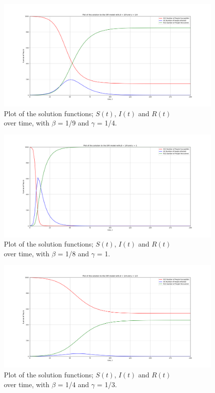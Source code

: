 \documentclass{article}
\begin{document}
\begin{figure}[!hp]
  \centering
  \includegraphics[width=1\linewidth]{Q2_plot2.png}
  \caption{Plot of the solution functions; $S(t)$, $I(t)$ and $R(t)$ \\ over time, with $\beta$ = 1/9 and $\gamma$ = 1/4.}
  \label{fig:Q2_plot2.png}
\end{figure}

\begin{figure}[!hp]
  \centering
  \includegraphics[width=1\linewidth]{Q2_plot3.png}
  \caption{Plot of the solution functions; $S(t)$, $I(t)$ and $R(t)$ \\ over time, with $\beta$ = 1/8 and $\gamma$ = 1.}
  \label{fig:Q2_plot3.png}
\end{figure}

\begin{figure}[!hp]
  \centering
  \includegraphics[width=1\linewidth]{Q2_plot4.png}
  \caption{Plot of the solution functions; $S(t)$, $I(t)$ and $R(t)$ \\ over time, with $\beta$ = 1/4 and $\gamma$ = 1/3.}
  \label{fig:Q2_plot4.png}
\end{figure}
\bigskip
\bigskip
\end{document}
